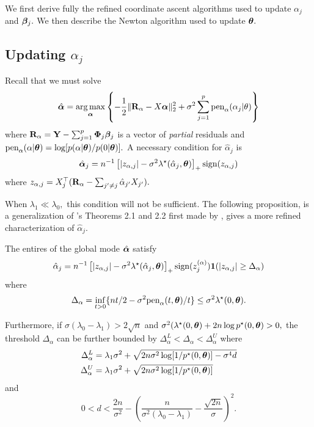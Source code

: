 
We first derive fully the refined coordinate ascent algorithms used to update $\alpha_{j}$ and $\boldsymbol{\beta}_{j}.$
We then describe the Newton algorithm used to update $\boldsymbol{\theta}.$

\subsection{Updating $\alpha_{j}$}

Recall that we must solve
\begin{align*}
\hat{\boldsymbol{\alpha}} = \operatorname*{arg\,max}_{\boldsymbol{\alpha}}\left\{-\frac{1}{2}\lVert \mathbf{R}_{\alpha} - X\boldsymbol{\alpha} \rVert_{2}^{2} + \sigma^{2}\sum_{j = 1}^{p}{\text{pen}_{\alpha}(\alpha_{j} \vert \theta)}\right\}
\end{align*}
where $\mathbf{R}_{\alpha} = \mathbf{Y} - \sum_{j = 1}^{p}{\boldsymbol{\Phi}_{j}\boldsymbol{\beta}_{j}}$ is a vector of \textit{partial} residuals and $\text{pen}_{\alpha}(\alpha \vert \boldsymbol{\theta}) = \log[p(\alpha\vert\boldsymbol{\theta})/p(0\vert\boldsymbol{\theta})].$
A necessary condition for $\hat{\alpha}_{j}$ is
$$
\hat{\boldsymbol{\alpha}}_{j} = n^{-1}\left[ \lvert z_{\alpha,j} \rvert - \sigma^{2}\lambda^{\star}(\hat{\alpha}_{j}, \boldsymbol{\theta}) \right]_{+}\text{sign}(z_{\alpha,j}) 
$$
where $z_{\alpha,j} = X_{j}^{\top}(\mathbf{R}_{\alpha} - \sum_{j' \neq j}{\hat{\alpha}_{j'}X_{j'}}).$ 

When $\lambda_{1} \ll \lambda_{0},$ this condition will not be sufficient. 
The following proposition, is a generalization of \citet{RockovaGeorge2018}'s Theorems 2.1 and 2.2 first made by \citet{Moran2019}, gives a more refined characterization of $\hat{\alpha}_{j}.$

\begin{proposition}
\label{prop:refined_alpha}
The entires of the global mode $\hat{\boldsymbol{\alpha}}$ satisfy
$$
\hat{\alpha}_{j} = n^{-1}\left[ \lvert z_{\alpha,j} \rvert - \sigma^{2}\lambda^{\star}(\hat{\alpha}_{j}, \boldsymbol{\theta}) \right]_{+}\text{sign}(z^{(\alpha)}_{j}) \mathbf{1}(\lvert z_{\alpha,j} \rvert \geq \Delta_{\alpha}) 
$$
where 
$$
\Delta_{\alpha} = \inf_{t > 0}\{nt/2 - \sigma^{2}\text{pen}_{\alpha}(t, \boldsymbol{\theta})/t\} \leq \sigma^{2}\lambda^{\star}(0,\boldsymbol{\theta}).
$$

Furthermore, if $\sigma(\lambda_{0} - \lambda_{1}) > 2\sqrt{n}$ and $\sigma^{2}(\lambda^{\star}(0,\boldsymbol{\theta}) + 2n\log{p^{\star}(0,\boldsymbol{\theta})} > 0,$ the threshold $\Delta_{\alpha}$ can be further bounded by $ \Delta^{L}_{\alpha} < \Delta_{\alpha} < \Delta^{U}_{\alpha}$ where
\begin{align*}
\Delta^{L}_{\alpha} &= \lambda_{1}\sigma^{2} + \sqrt{2n\sigma^{2}\log[1/p^{\star}(0,\boldsymbol{\theta})] - \sigma^{4}d} \\
\Delta^{U}_{\alpha} &= \lambda_{1}\sigma^{2} + \sqrt{2n\sigma^{2}\log[1/p^{\star}(0,\boldsymbol{\theta})]}
\end{align*} 
and 
$$
0 < d < \frac{2n}{\sigma^{2}} - \left(\frac{n}{\sigma^{2}(\lambda_{0} - \lambda_{1})} - \frac{\sqrt{2n}}{\sigma}\right)^{2}.
$$
\end{proposition}


